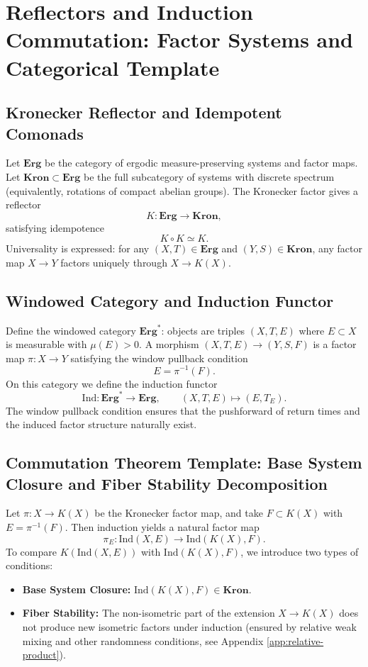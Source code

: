 \section{Reflectors and Induction Commutation: Factor Systems and Categorical Template}

\subsection{Kronecker Reflector and Idempotent Comonads}

Let $\mathbf{Erg}$ be the category of ergodic measure-preserving systems and factor maps. Let $\mathbf{Kron}\subset\mathbf{Erg}$ be the full subcategory of systems with discrete spectrum (equivalently, rotations of compact abelian groups). The Kronecker factor gives a reflector
\[
K:\mathbf{Erg}\to \mathbf{Kron},
\]
satisfying idempotence
\[
K\circ K\simeq K.
\]
Universality is expressed: for any $(X,T)\in\mathbf{Erg}$ and $(Y,S)\in\mathbf{Kron}$, any factor map $X\to Y$ factors uniquely through $X\to K(X)$.

\subsection{Windowed Category and Induction Functor}

Define the windowed category $\mathbf{Erg}^{\ast}$: objects are triples $(X,T,E)$ where $E\subset X$ is measurable with $\mu(E)>0$. A morphism $(X,T,E)\to(Y,S,F)$ is a factor map $\pi:X\to Y$ satisfying the window pullback condition
\[
E=\pi^{-1}(F).
\]
On this category we define the induction functor
\[
\mathrm{Ind}:\mathbf{Erg}^{\ast}\to\mathbf{Erg},\qquad (X,T,E)\mapsto(E,T_E).
\]
The window pullback condition ensures that the pushforward of return times and the induced factor structure naturally exist.

\subsection{Commutation Theorem Template: Base System Closure and Fiber Stability Decomposition}

Let $\pi:X\to K(X)$ be the Kronecker factor map, and take $F\subset K(X)$ with $E=\pi^{-1}(F)$. Then induction yields a natural factor map
\[
\pi_E:\mathrm{Ind}(X,E)\to \mathrm{Ind}(K(X),F).
\]
To compare $K(\mathrm{Ind}(X,E))$ with $\mathrm{Ind}(K(X),F)$, we introduce two types of conditions:
\begin{itemize}
  \item \textbf{Base System Closure:} $\mathrm{Ind}(K(X),F)\in\mathbf{Kron}$.
  \item \textbf{Fiber Stability:} The non-isometric part of the extension $X\to K(X)$ does not produce new isometric factors under induction (ensured by relative weak mixing and other randomness conditions, see Appendix \ref{app:relative-product}).
\end{itemize}

